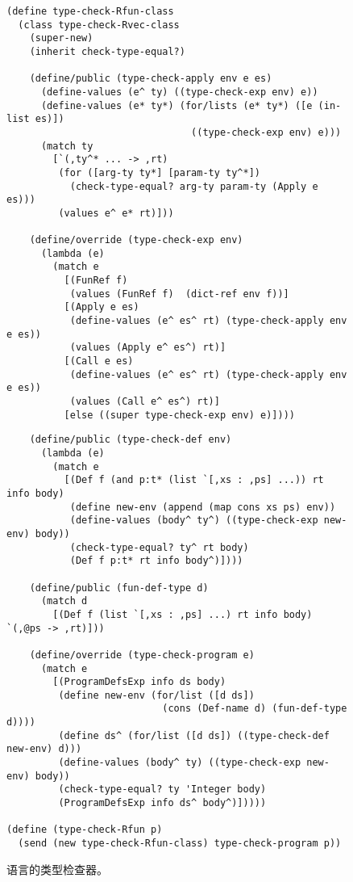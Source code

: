 \documentclass[11pt]{book}
\begin{document}
\begin{figure}[tp]
\begin{lstlisting}
(define type-check-Rfun-class
  (class type-check-Rvec-class
    (super-new)
    (inherit check-type-equal?)

    (define/public (type-check-apply env e es)
      (define-values (e^ ty) ((type-check-exp env) e))
      (define-values (e* ty*) (for/lists (e* ty*) ([e (in-list es)])
                                ((type-check-exp env) e)))
      (match ty
        [`(,ty^* ... -> ,rt)
         (for ([arg-ty ty*] [param-ty ty^*])
           (check-type-equal? arg-ty param-ty (Apply e es)))
         (values e^ e* rt)]))

    (define/override (type-check-exp env)
      (lambda (e)
        (match e
          [(FunRef f)
           (values (FunRef f)  (dict-ref env f))]
          [(Apply e es)
           (define-values (e^ es^ rt) (type-check-apply env e es))
           (values (Apply e^ es^) rt)]
          [(Call e es)
           (define-values (e^ es^ rt) (type-check-apply env e es))
           (values (Call e^ es^) rt)]
          [else ((super type-check-exp env) e)])))
\end{lstlisting}
\end{figure}
\begin{figure}[tp]
\begin{lstlisting}
    (define/public (type-check-def env)
      (lambda (e)
        (match e
          [(Def f (and p:t* (list `[,xs : ,ps] ...)) rt info body)
           (define new-env (append (map cons xs ps) env))
           (define-values (body^ ty^) ((type-check-exp new-env) body))
           (check-type-equal? ty^ rt body)
           (Def f p:t* rt info body^)])))	 

    (define/public (fun-def-type d)
      (match d
        [(Def f (list `[,xs : ,ps] ...) rt info body)  `(,@ps -> ,rt)]))

    (define/override (type-check-program e)
      (match e
        [(ProgramDefsExp info ds body)
         (define new-env (for/list ([d ds])
                           (cons (Def-name d) (fun-def-type d))))
         (define ds^ (for/list ([d ds]) ((type-check-def new-env) d)))
         (define-values (body^ ty) ((type-check-exp new-env) body))
         (check-type-equal? ty 'Integer body)
         (ProgramDefsExp info ds^ body^)]))))

(define (type-check-Rfun p)
  (send (new type-check-Rfun-class) type-check-program p))
\end{lstlisting}
\caption{ \LangFun{} 语言的类型检查器。}
\label{fig:type-check-Rfun}
\end{figure}
\end{document}
